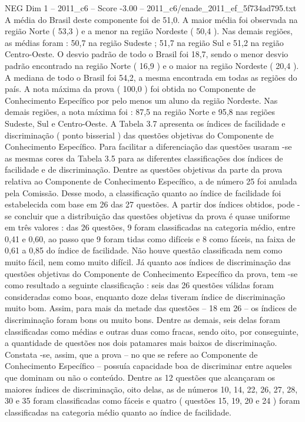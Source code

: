 \begin{textsample}{NEG Dim 1 – 2011\_c6 – Score -3.00 – 2011\_c6/enade\_2011\_ef\_5f734ad795.txt}
A média do Brasil deste componente foi de 51,0.
A maior média foi observada na região Norte ( 53,3 ) e a menor na região Nordeste ( 50,4 ).
Nas demais regiões, as médias foram : 50,7 na região Sudeste ; 51,7 na região Sul e 51,2 na região Centro-Oeste.
O desvio padrão de todo o Brasil foi 18,7, sendo o menor desvio padrão encontrado na região Norte ( 16,9 ) e o maior na região Nordeste ( 20,4 ).
A mediana de todo o Brasil foi 54,2, a mesma encontrada em todas as regiões do país.
A nota máxima da prova ( 100,0 ) foi obtida no Componente de Conhecimento Específico por pelo menos um aluno da região Nordeste.
Nas demais regiões, a nota máxima foi : 87,5 na região Norte e 95,8 nas regiões Sudeste, Sul e Centro-Oeste.
A Tabela 3.7 apresenta os índices de facilidade e discriminação ( ponto bisserial ) das questões objetivas do Componente de Conhecimento Específico.
Para facilitar a diferenciação das questões usaram -se as mesmas cores da Tabela 3.5 para as diferentes classificações dos índices de facilidade e de discriminação.
Dentre as questões objetivas da parte da prova relativa ao Componente de Conhecimento Específico, a de número 25 foi anulada pela Comissão.
Desse modo, a classificação quanto ao índice de facilidade foi estabelecida com base em 26 das 27 questões.
A partir dos índices obtidos, pode -se concluir que a distribuição das questões objetivas da prova é quase uniforme em três valores : das 26 questões, 9 foram classificadas na categoria médio, entre 0,41 e 0,60, ao passo que 9 foram tidas como difíceis e 8 como fáceis, na faixa de 0,61 a 0,85 do índice de facilidade.
Não houve questão classificada nem como muito fácil, nem como muito difícil.
Já quanto aos índices de discriminação das questões objetivas do Componente de Conhecimento Específico da prova, tem -se como resultado a seguinte classificação : seis das 26 questões válidas foram consideradas como boas, enquanto doze delas tiveram índice de discriminação muito bom.
Assim, para mais da metade das questões – 18 em 26 – os índices de discriminação foram bons ou muito bons.
Dentre as demais, seis delas foram classificadas como médias e outras duas como fracas, sendo oito, por conseguinte, a quantidade de questões nos dois patamares mais baixos de discriminação.
Constata -se, assim, que a prova – no que se refere ao Componente de Conhecimento Específico – possuía capacidade boa de discriminar entre aqueles que dominam ou não o conteúdo.
Dentre as 12 questões que alcançaram os maiores índices de discriminação, oito delas, as de números 10, 14, 22, 26, 27, 28, 30 e 35 foram classificadas como fáceis e quatro ( questões 15, 19, 20 e 24 ) foram classificadas na categoria médio quanto ao índice de facilidade.

\end{textsample}
